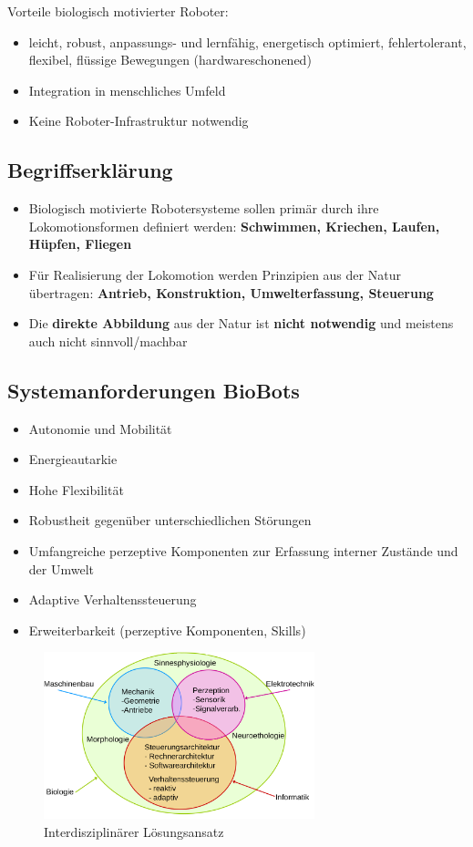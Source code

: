 Vorteile biologisch motivierter Roboter:
\begin{itemize}
	\item leicht, robust, anpassungs- und lernfähig, energetisch optimiert, fehlertolerant, flexibel, flüssige Bewegungen (hardwareschonened)
	\item Integration in menschliches Umfeld
	\item Keine Roboter-Infrastruktur notwendig
\end{itemize}

\subsection{Begriffserklärung}
\begin{itemize}
	\item Biologisch motivierte Robotersysteme sollen primär durch ihre Lokomotionsformen definiert werden: \textbf{Schwimmen, Kriechen, Laufen, Hüpfen, Fliegen}
	\item Für Realisierung der Lokomotion werden Prinzipien aus der Natur übertragen: \textbf{Antrieb, Konstruktion, Umwelterfassung, Steuerung}
	\item Die \textbf{direkte Abbildung} aus der Natur ist \textbf{nicht notwendig} und meistens auch nicht sinnvoll/machbar
\end{itemize}

\subsection{Systemanforderungen BioBots}
\begin{itemize}
	\item Autonomie und Mobilität
	\item Energieautarkie
	\item Hohe Flexibilität
	\item Robustheit gegenüber unterschiedlichen Störungen
	\item Umfangreiche perzeptive Komponenten zur Erfassung interner Zustände und der Umwelt
	\item Adaptive Verhaltenssteuerung
	\item Erweiterbarkeit (perzeptive Komponenten, Skills)	
\end{itemize}

\begin{figure}
	\centering
	\includegraphics[width=0.7\textwidth]{figures/interdisziplinaer.png}
	\caption{Interdisziplinärer Lösungsansatz}
\end{figure}

